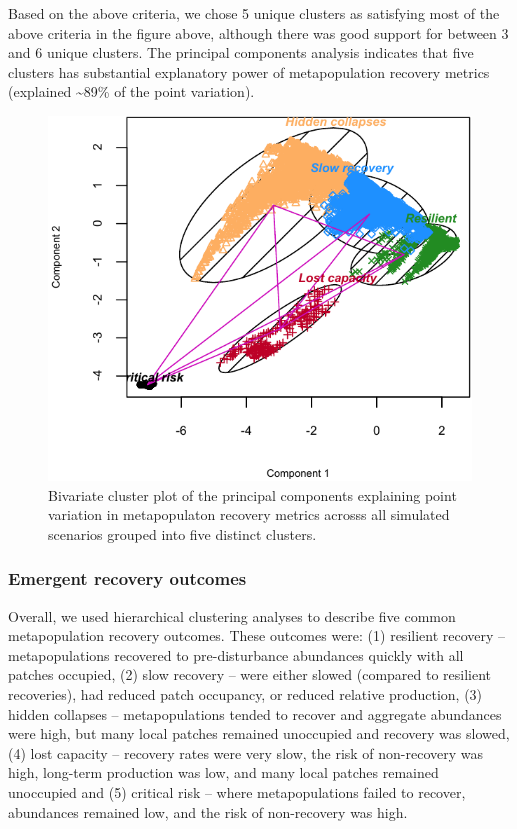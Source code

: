 \documentclass[
]{article}
\begin{document}
Based on the above criteria, we chose 5 unique clusters as satisfying
most of the above criteria in the figure above, although there was good
support for between 3 and 6 unique clusters. The principal components
analysis indicates that five clusters has substantial explanatory power
of metapopulation recovery metrics (explained \textasciitilde89\% of the
point variation).

\begin{figure}[H]

{\centering \includegraphics{Managing_for_ecological_surprises_in_metapopulations_files/figure-latex/clustering plot-1} 

}

\caption{Bivariate cluster plot of the principal components explaining point variation in metapopulaton recovery metrics acrosss all simulated scenarios grouped into five distinct clusters.}\label{fig:clustering plot}
\end{figure}

\hypertarget{emergent-recovery-outcomes}{%
\subsubsection{Emergent recovery
outcomes}\label{emergent-recovery-outcomes}}

Overall, we used hierarchical clustering analyses to describe five
common metapopulation recovery outcomes. These outcomes were: (1)
resilient recovery -- metapopulations recovered to pre-disturbance
abundances quickly with all patches occupied, (2) slow recovery -- were
either slowed (compared to resilient recoveries), had reduced patch
occupancy, or reduced relative production, (3) hidden collapses --
metapopulations tended to recover and aggregate abundances were high,
but many local patches remained unoccupied and recovery was slowed, (4)
lost capacity -- recovery rates were very slow, the risk of non-recovery
was high, long-term production was low, and many local patches remained
unoccupied and (5) critical risk -- where metapopulations failed to
recover, abundances remained low, and the risk of non-recovery was high.
\end{document}
